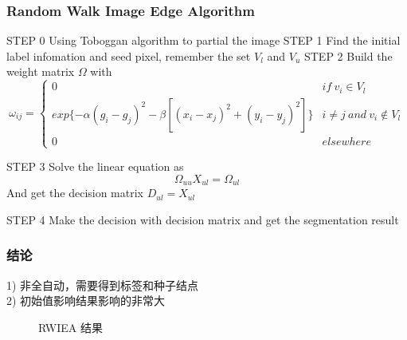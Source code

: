 \documentclass[notheorems, UTF8]{ctexbeamer}
\begin{document}
\begin{frame}
\frametitle{Random Walk Image Edge Algorithm}
\begin{algorithm}[H]
\begin{algorithmic}
\State STEP 0 Using Toboggan algorithm to partial the image
\State STEP 1 Find the initial label infomation and seed pixel, remember the set $V_l$ and $V_u$
\State STEP 2 Build the weight matrix $\Omega$ with
\begin{displaymath}
\omega_{ij} = \left\{
\begin{array}{ll}
0 & if\ v_i \in V_l\\
exp\{-\alpha(g_i - g_j)^2 -\beta[(x_i-x_j)^2 + (y_i-y_j)^2 ]\}  &  i \neq j\ and\ v_i \not\in V_l\\
0 & elsewhere
\end{array}
\right .
\end{displaymath}

\State STEP 3 Solve the linear equation as 
\begin{displaymath}
\Omega_{uu}X_{ul} = \Omega_{ul}
\end{displaymath}
And get the decision matrix $D_{ul} = X_{ul}$

\State STEP 4 Make the decision with decision matrix and get the segmentation result

\end{algorithmic}
\end{algorithm}
\end{frame}




\begin{frame}
\frametitle{结论}
1) 非全自动，需要得到标签和种子结点\\
2) 初始值影响结果影响的非常大\\
\begin{figure}[H]
\centering
{}
\caption{RWIEA 结果} \label{fig:1}
\end{figure}

\end{frame}
\end{document}
